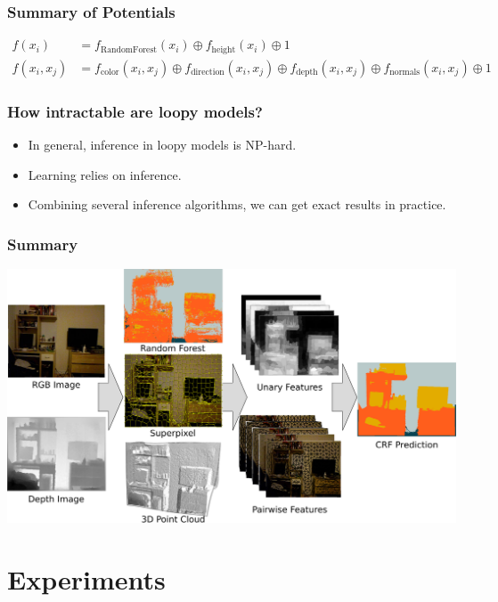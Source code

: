 \documentclass[final,ignorenonframetext,compress]{beamer}
\begin{document}
    \begin{frame}
        \frametitle{Summary of Potentials}
        \begin{align*}
            f(x_i) &= f_\text{RandomForest}(x_i) \oplus f_\text{height}(x_i) \oplus 1\\
            f(x_i, x_j) &= f_\text{color}(x_i, x_j) \oplus f_\text{direction}(x_i, x_j) \oplus f_\text{depth}(x_i, x_j) \oplus f_\text{normals}(x_i, x_j) \oplus 1
        \end{align*}
        
    \end{frame}

    \begin{frame}
        \frametitle{How intractable are loopy models?}
        \begin{itemize}
            \item In general, inference in loopy models is NP-hard.
            \item Learning relies on inference.
            \item Combining several inference algorithms, we can get exact results in practice. %
        \end{itemize}
    \end{frame}

    \begin{frame}
        \frametitle{Summary}
        \begin{center}
            \includegraphics[width=.9\linewidth]{images/teaser}
        \end{center}
    \end{frame}

    \section{Experiments}
    
\end{document}
